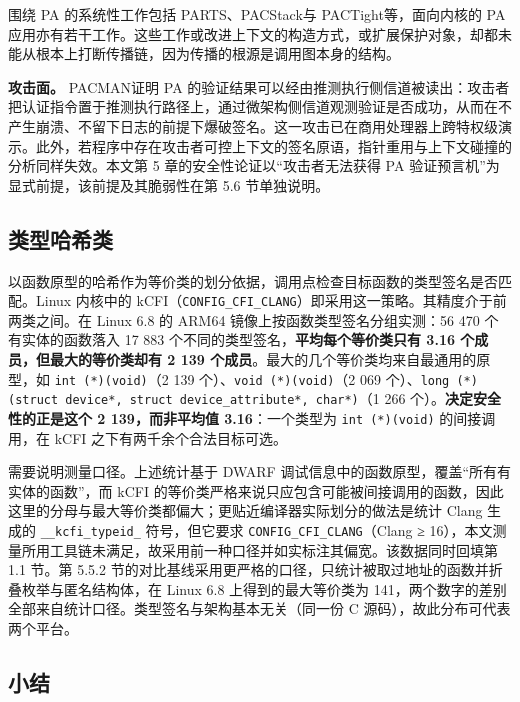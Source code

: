 围绕 PA 的系统性工作包括 PARTS\citep{liljestrand2019pac}、PACStack\citep{liljestrand2021pacstack}与 PACTight\citep{ismail2022pactight}等，面向内核的 PA 应用亦有若干工作。这些工作或改进上下文的构造方式，或扩展保护对象，却都未能从根本上打断传播链，因为传播的根源是调用图本身的结构。

\textbf{攻击面。} PACMAN\citep{ravichandran2022pacman}证明 PA 的验证结果可以经由推测执行侧信道被读出：攻击者把认证指令置于推测执行路径上，通过微架构侧信道观测验证是否成功，从而在不产生崩溃、不留下日志的前提下爆破签名。这一攻击已在商用处理器上跨特权级演示。此外，若程序中存在攻击者可控上下文的签名原语，指针重用与上下文碰撞的分析同样失效。本文第 5 章的安全性论证以“攻击者无法获得 PA 验证预言机”为显式前提，该前提及其脆弱性在第 5.6 节单独说明。

\subsection{类型哈希类}

以函数原型的哈希作为等价类的划分依据，调用点检查目标函数的类型签名是否匹配。Linux 内核中的 kCFI\citep{clang2022kcfi}（\lstinline[breaklines=false]@CONFIG_CFI_CLANG@）即采用这一策略。其精度介于前两类之间。在 Linux 6.8 的 ARM64 镜像上按函数类型签名分组实测：56 470 个有实体的函数落入 17 883 个不同的类型签名，\textbf{平均每个等价类只有 3.16 个成员，但最大的等价类却有 2 139 个成员}。最大的几个等价类均来自最通用的原型，如 \lstinline[breaklines=false]@int (*)(void)@（2 139 个）、\lstinline[breaklines=false]@void (*)(void)@（2 069 个）、\lstinline[breaklines=false]@long (*)(struct device*, struct device_attribute*, char*)@（1 266 个）。\textbf{决定安全性的正是这个 2 139，而非平均值 3.16}\citep{burow2017cfi}：一个类型为 \lstinline[breaklines=false]@int (*)(void)@ 的间接调用，在 kCFI 之下有两千余个合法目标可选。

需要说明测量口径。上述统计基于 DWARF 调试信息中的函数原型，覆盖“所有有实体的函数”，而 kCFI 的等价类严格来说只应包含可能被间接调用的函数，因此这里的分母与最大等价类都偏大；更贴近编译器实际划分的做法是统计 Clang 生成的 \lstinline[breaklines=false]@__kcfi_typeid_@ 符号，但它要求 \lstinline[breaklines=false]@CONFIG_CFI_CLANG@（Clang ≥ 16），本文测量所用工具链未满足，故采用前一种口径并如实标注其偏宽。该数据同时回填第 1.1 节。第 5.5.2 节的对比基线采用更严格的口径，只统计被取过地址的函数并折叠枚举与匿名结构体，在 Linux 6.8 上得到的最大等价类为 141，两个数字的差别全部来自统计口径。类型签名与架构基本无关（同一份 C 源码），故此分布可代表两个平台。

\subsection{小结}

